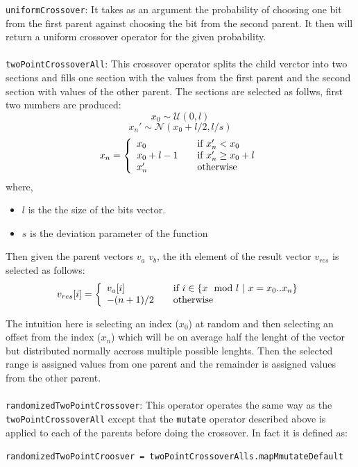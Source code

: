 \documentclass[10pt]{article}
\begin{document}
\verb+uniformCrossover+: It takes as an argument the probability of choosing one bit from the first parent against choosing the bit from the second parent. It then will return a uniform crossover operator for the given probability.
\\\\
\verb+twoPointCrossoverAll+: This crossover operator splits the child verctor into two sections and fills one section with the values from the first parent and the second section with values of the other parent. The sections are selected as follws, first two numbers are produced:
\[
x_0 \sim \mathcal{U}(0,l)
\]
\[
x_n' \sim \mathcal{N}(x_0 + l/2,l/s)
\]
\[
x_n = \left\{
    \begin{array}{l l}
    x_0 & \quad \text{if $x_n' < x_0$}\\
    x_0+l-1 & \quad \text{if $x_n' \geq x_0 + l$}\\
    x_n' & \quad \text{otherwise}
    \end{array} \right.
\]
where,
\begin{itemize}
\item $l$ is the the size of the bits vector.
\item $s$ is the deviation parameter of the function
\end{itemize}

Then given the parent vectors $v_a$ $v_b$, the ith element of the result vector $v_{res}$ is selected as follows:
\[ v_{res}[i] = \left\{ 
  \begin{array}{l l}
    v_a[i] & \quad \text{if $i \in \{x \mod{l}\ |\ x = x_0 .. x_n \}$}\\
    -(n+1)/2 & \quad \text{otherwise}
  \end{array} \right.
\]

The intuition here is selecting an index ($x_0$) at random and then selecting an offset from the index ($x_n$) which will be on average half the lenght of the vector but distributed normally accross multiple possible lenghts. Then the selected range is assigned values from one parent and the remainder is assigned values from the other parent.
\\\\
\verb+randomizedTwoPointCrossover+: This operator operates the same way as the \verb+twoPointCrossoverAll+ except that the \verb+mutate+ operator described above is applied to each of the parents before doing the crossover. In fact it is defined as:
\begin{alltt}
 randomizedTwoPointCroosver\ =\ twoPointCrossoverAll s . mapM mutateDefault
\end{alltt}
\end{document}
